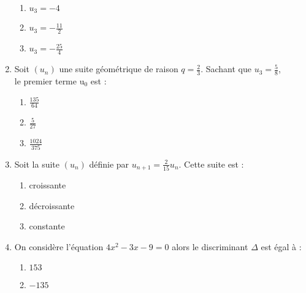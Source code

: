\documentclass[oneside,twocolumn,landscape]{book}
\begin{document}
\begin{enumerate}
\begin{enumerate}
\item\MauvaiseReponse $u_{3}=-4$

\item\MauvaiseReponse $u_{3}=-\frac{11}{2}$

\item\BonneReponse $u_{3}=-\frac{25}{4}$

\end{enumerate}



\item Soit $\left(u_{n}\right)$ une suite géométrique de raison $q=\frac{2}{3}$. Sachant que $u_{3}=\frac{5}{8}$,\\ le premier terme $\mathrm{u}_ {0}$ est :

\begin{enumerate}

\item\BonneReponse $\frac{135}{64}$

\item\MauvaiseReponse $\frac{5}{27}$

\item\MauvaiseReponse $\frac{1024}{375}$

\end{enumerate}



\item Soit la suite $\left(u_{n}\right)$ définie par $u_{n+1}=\frac{2}{15}u_n$. Cette suite est :

\begin{enumerate}

\item\MauvaiseReponse croissante

\item\BonneReponse décroissante

\item\MauvaiseReponse constante

\end{enumerate}


\newpage

\item On considère l'équation $4x^{2}-3 x-9=0$ alors le discriminant $\Delta$ est égal à :

\begin{enumerate}

\item\BonneReponse $153$

\item\MauvaiseReponse $-135$


\end{enumerate}
\end{enumerate}
\end{document}

